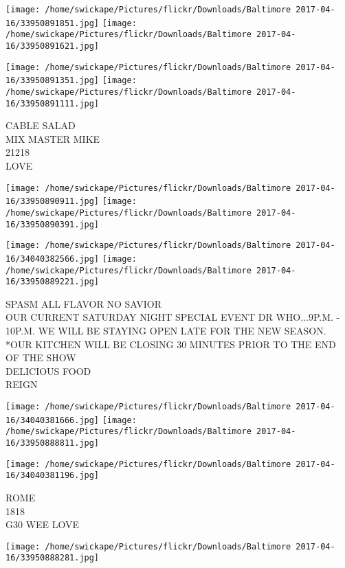 \documentclass[10pt,letterpaper]{article}
\begin{document}
\texttt{[image: /home/swickape/Pictures/flickr/Downloads/Baltimore 2017-04-16/33950891851.jpg]}
\texttt{[image: /home/swickape/Pictures/flickr/Downloads/Baltimore 2017-04-16/33950891621.jpg]}

\texttt{[image: /home/swickape/Pictures/flickr/Downloads/Baltimore 2017-04-16/33950891351.jpg]}
\texttt{[image: /home/swickape/Pictures/flickr/Downloads/Baltimore 2017-04-16/33950891111.jpg]}

CABLE SALAD\\
MIX MASTER MIKE\\
21218\\
LOVE\\
\pagebreak

\texttt{[image: /home/swickape/Pictures/flickr/Downloads/Baltimore 2017-04-16/33950890911.jpg]}
\texttt{[image: /home/swickape/Pictures/flickr/Downloads/Baltimore 2017-04-16/33950890391.jpg]}

\texttt{[image: /home/swickape/Pictures/flickr/Downloads/Baltimore 2017-04-16/34040382566.jpg]}
\texttt{[image: /home/swickape/Pictures/flickr/Downloads/Baltimore 2017-04-16/33950889221.jpg]}

SPASM ALL FLAVOR NO SAVIOR\\
OUR CURRENT SATURDAY NIGHT SPECIAL EVENT DR WHO...9P.M. {-} 10P.M. WE WILL BE STAYING OPEN LATE FOR THE NEW SEASON.  *OUR KITCHEN WILL BE CLOSING 30 MINUTES PRIOR TO THE END OF THE SHOW\\
DELICIOUS FOOD\\
REIGN\\
\pagebreak

\texttt{[image: /home/swickape/Pictures/flickr/Downloads/Baltimore 2017-04-16/34040381666.jpg]}
\texttt{[image: /home/swickape/Pictures/flickr/Downloads/Baltimore 2017-04-16/33950888811.jpg]}

\vspace{0.25in}
\texttt{[image: /home/swickape/Pictures/flickr/Downloads/Baltimore 2017-04-16/34040381196.jpg]}

ROME\\
1818\\
G30 WEE LOVE\\
\pagebreak

\texttt{[image: /home/swickape/Pictures/flickr/Downloads/Baltimore 2017-04-16/33950888281.jpg]}
\end{document}
